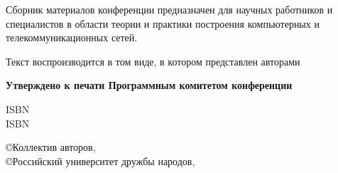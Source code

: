 {Сборник материалов конференции предназначен для научных работников и специалистов в области теории и
практики построения компьютерных и телекоммуникационных сетей. 

\bigskip

\begin{center}
Текст воспроизводится в том виде, в котором представлен авторами
\end{center}


\bigskip

\begin{center}
\textbf{Утверждено к печати Программным комитетом конференции}
\end{center}

\bigskip

\noindent
\begin{minipage}[t]{0.35\linewidth}
\noindent
ISBN \isbnVol\\
ISBN \isbn
\end{minipage}
\hfill
\begin{minipage}[t]{0.6\linewidth}
\noindent
\copyright Коллектив авторов, \year\\
\copyright Российский университет дружбы народов, \year
\end{minipage}

} %

\clearpage

\setcounter{page}{3}
